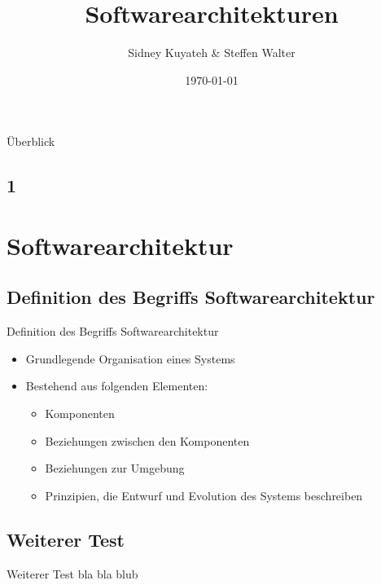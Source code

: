 \documentclass{beamer}
\title{Softwarearchitekturen}
\author{Sidney Kuyateh \& Steffen Walter}
\institute{Duale Hochschule Baden-Württemberg}
\date{\today}
\begin{document}
	\maketitle
	\begin{frame}{Überblick}
		\tableofcontents
	\end{frame}
	
		\subsection{1}	
	
	\section{Softwarearchitektur}
		\subsection{Definition des Begriffs Softwarearchitektur}
			\begin{frame}{Definition des Begriffs Softwarearchitektur}
				\begin{itemize}
					\item Grundlegende Organisation eines Systems
					\item Bestehend aus folgenden Elementen:
					\begin{itemize}
						\item Komponenten
						\item Beziehungen zwischen den Komponenten
						\item Beziehungen zur Umgebung
						\item Prinzipien, die Entwurf und Evolution des Systems beschreiben
					\end{itemize}
				\end{itemize}
			\end{frame}
		\subsection{Weiterer Test}
			\begin{frame}{Weiterer Test}
				bla bla blub
			\end{frame}
\end{document}
